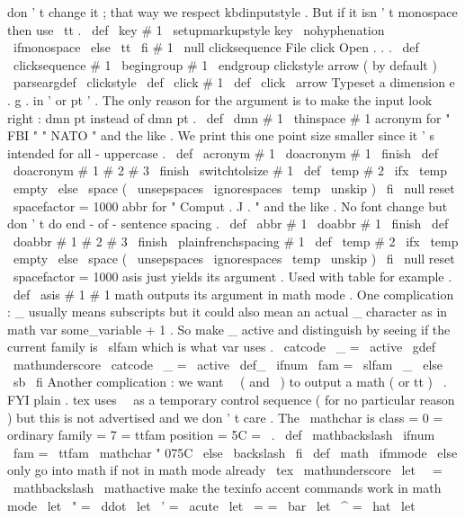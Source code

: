{{{don
'
t
change
it
;
that
way
we
respect
kbdinputstyle
.
But
%
if
it
isn
'
t
monospace
then
use
\
tt
.
%
\
def
\
key
#
1
{
{
\
setupmarkupstyle
{
key
}
%
\
nohyphenation
\
ifmonospace
\
else
\
tt
\
fi
#
1
}
\
null
}
%
clicksequence
{
File
click
{
}
Open
.
.
.
}
\
def
\
clicksequence
#
1
{
\
begingroup
#
1
\
endgroup
}
%
clickstyle
arrow
(
by
default
)
\
parseargdef
\
clickstyle
{
\
def
\
click
{
#
1
}
}
\
def
\
click
{
\
arrow
}
%
Typeset
a
dimension
e
.
g
.
in
'
or
pt
'
.
The
only
reason
for
the
%
argument
is
to
make
the
input
look
right
:
dmn
{
pt
}
instead
of
dmn
{
}
pt
.
%
\
def
\
dmn
#
1
{
\
thinspace
#
1
}
%
acronym
for
"
FBI
"
"
NATO
"
and
the
like
.
%
We
print
this
one
point
size
smaller
since
it
'
s
intended
for
%
all
-
uppercase
.
%
\
def
\
acronym
#
1
{
\
doacronym
#
1
\
finish
}
\
def
\
doacronym
#
1
#
2
#
3
\
finish
{
%
{
\
switchtolsize
#
1
}
%
\
def
\
temp
{
#
2
}
%
\
ifx
\
temp
\
empty
\
else
\
space
(
{
\
unsepspaces
\
ignorespaces
\
temp
\
unskip
}
)
%
\
fi
\
null
%
reset
\
spacefactor
=
1000
}
%
abbr
for
"
Comput
.
J
.
"
and
the
like
.
%
No
font
change
but
don
'
t
do
end
-
of
-
sentence
spacing
.
%
\
def
\
abbr
#
1
{
\
doabbr
#
1
\
finish
}
\
def
\
doabbr
#
1
#
2
#
3
\
finish
{
%
{
\
plainfrenchspacing
#
1
}
%
\
def
\
temp
{
#
2
}
%
\
ifx
\
temp
\
empty
\
else
\
space
(
{
\
unsepspaces
\
ignorespaces
\
temp
\
unskip
}
)
%
\
fi
\
null
%
reset
\
spacefactor
=
1000
}
%
asis
just
yields
its
argument
.
Used
with
table
for
example
.
%
\
def
\
asis
#
1
{
#
1
}
%
math
outputs
its
argument
in
math
mode
.
%
%
One
complication
:
_
usually
means
subscripts
but
it
could
also
mean
%
an
actual
_
character
as
in
math
{
var
{
some_variable
}
+
1
}
.
So
make
%
_
active
and
distinguish
by
seeing
if
the
current
family
is
\
slfam
%
which
is
what
var
uses
.
{
\
catcode
\
_
=
\
active
\
gdef
\
mathunderscore
{
%
\
catcode
\
_
=
\
active
\
def_
{
\
ifnum
\
fam
=
\
slfam
\
_
\
else
\
sb
\
fi
}
%
}
}
%
Another
complication
:
we
want
\
\
(
and
\
)
to
output
a
math
(
or
tt
)
\
.
%
FYI
plain
.
tex
uses
\
\
as
a
temporary
control
sequence
(
for
no
%
particular
reason
)
but
this
is
not
advertised
and
we
don
'
t
care
.
%
%
The
\
mathchar
is
class
=
0
=
ordinary
family
=
7
=
ttfam
position
=
5C
=
\
.
\
def
\
mathbackslash
{
\
ifnum
\
fam
=
\
ttfam
\
mathchar
"
075C
\
else
\
backslash
\
fi
}
%
\
def
\
math
{
%
\
ifmmode
\
else
%
only
go
into
math
if
not
in
math
mode
already
\
tex
\
mathunderscore
\
let
\
\
=
\
mathbackslash
\
mathactive
%
make
the
texinfo
accent
commands
work
in
math
mode
\
let
\
"
=
\
ddot
\
let
\
'
=
\
acute
\
let
\
=
=
\
bar
\
let
\
^
=
\
hat
\
let
\
}}}}
